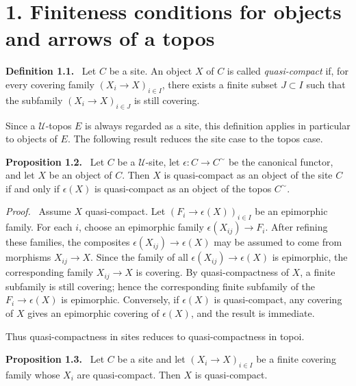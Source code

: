 \documentclass[11pt]{article}
\newcommand{\U}{\mathcal{U}}
\newenvironment{statement}[1]{\par\medskip\noindent\textbf{#1.}\ }{\par\medskip}
\newenvironment{prooftext}{\par\noindent\emph{Proof.}\ }{\par\medskip}
\begin{document}
\section*{1. Finiteness conditions for objects and arrows of a topos}

\begin{statement}{Definition 1.1}
Let \(C\) be a site. An object \(X\) of \(C\) is called \emph{quasi-compact} if, for every covering family \((X_i\to X)_{i\in I}\), there exists a finite subset \(J\subset I\) such that the subfamily \((X_i\to X)_{i\in J}\) is still covering.
\end{statement}

Since a \(\U\)-topos \(E\) is always regarded as a site, this definition applies in particular to objects of \(E\). The following result reduces the site case to the topos case.

\begin{statement}{Proposition 1.2}
Let \(C\) be a \(\U\)-site, let \(\epsilon:C\to C^\sim\) be the canonical functor, and let \(X\) be an object of \(C\). Then \(X\) is quasi-compact as an object of the site \(C\) if and only if \(\epsilon(X)\) is quasi-compact as an object of the topos \(C^\sim\).
\end{statement}

\begin{prooftext}
Assume \(X\) quasi-compact. Let \((F_i\to\epsilon(X))_{i\in I}\) be an epimorphic family. For each \(i\), choose an epimorphic family \(\epsilon(X_{ij})\to F_i\). After refining these families, the composites \(\epsilon(X_{ij})\to\epsilon(X)\) may be assumed to come from morphisms \(X_{ij}\to X\). Since the family of all \(\epsilon(X_{ij})\to\epsilon(X)\) is epimorphic, the corresponding family \(X_{ij}\to X\) is covering. By quasi-compactness of \(X\), a finite subfamily is still covering; hence the corresponding finite subfamily of the \(F_i\to\epsilon(X)\) is epimorphic. Conversely, if \(\epsilon(X)\) is quasi-compact, any covering of \(X\) gives an epimorphic covering of \(\epsilon(X)\), and the result is immediate.
\end{prooftext}

Thus quasi-compactness in sites reduces to quasi-compactness in topoi.

\begin{statement}{Proposition 1.3}
Let \(C\) be a site and let \((X_i\to X)_{i\in I}\) be a finite covering family whose \(X_i\) are quasi-compact. Then \(X\) is quasi-compact.
\end{statement}
\end{document}
